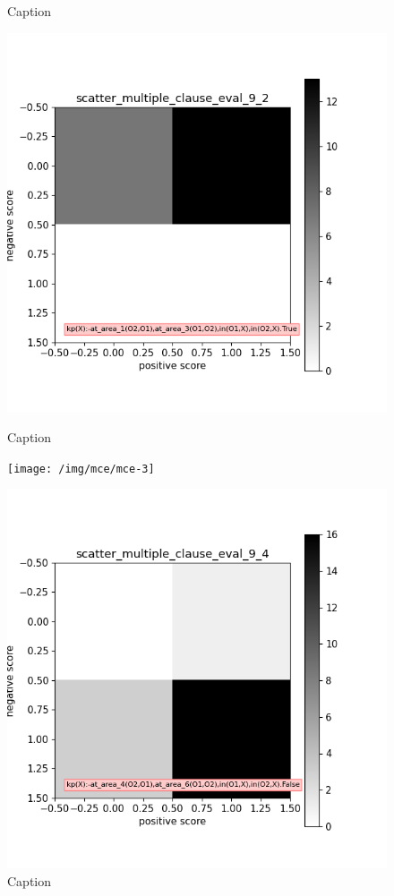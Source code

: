\begin{figure}[H]
\begin{minipage}{.3\textwidth}
        \caption{Caption}\label{label-b}
    \end{minipage}
    \begin{minipage}{.3\textwidth}
        \includegraphics[width=\textwidth]{img/mce/mce-2}
        \caption{Caption}\label{label-c}
    \end{minipage}
    \begin{minipage}[b]{.3\textwidth}
        \texttt{[image: /img/mce/mce-3]}
        \caption{Caption}\label{label-d}
    \end{minipage}
    \begin{minipage}[b]{.3\textwidth}
        \includegraphics[width=\textwidth]{img/mce/mce-4}

\end{minipage}
\end{figure}
